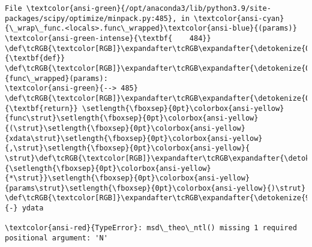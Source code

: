 \documentclass[11pt]{article}
\begin{document}
\begin{Verbatim}[commandchars=\\\{\}, frame=single, framerule=2mm, rulecolor=\color{outerrorbackground}]
File \textcolor{ansi-green}{/opt/anaconda3/lib/python3.9/site-packages/scipy/optimize/minpack.py:485}, in \textcolor{ansi-cyan}{\_wrap\_func.<locals>.func\_wrapped}\textcolor{ansi-blue}{(params)}
\textcolor{ansi-green-intense}{\textbf{    484}} \def\tcRGB{\textcolor[RGB]}\expandafter\tcRGB\expandafter{\detokenize{0,135,0}}{\textbf{def}} \def\tcRGB{\textcolor[RGB]}\expandafter\tcRGB\expandafter{\detokenize{0,0,255}}{func\_wrapped}(params):
\textcolor{ansi-green}{--> 485}     \def\tcRGB{\textcolor[RGB]}\expandafter\tcRGB\expandafter{\detokenize{0,135,0}}{\textbf{return}} \setlength{\fboxsep}{0pt}\colorbox{ansi-yellow}{func\strut}\setlength{\fboxsep}{0pt}\colorbox{ansi-yellow}{(\strut}\setlength{\fboxsep}{0pt}\colorbox{ansi-yellow}{xdata\strut}\setlength{\fboxsep}{0pt}\colorbox{ansi-yellow}{,\strut}\setlength{\fboxsep}{0pt}\colorbox{ansi-yellow}{ \strut}\def\tcRGB{\textcolor[RGB]}\expandafter\tcRGB\expandafter{\detokenize{98,98,98}}{\setlength{\fboxsep}{0pt}\colorbox{ansi-yellow}{*\strut}}\setlength{\fboxsep}{0pt}\colorbox{ansi-yellow}{params\strut}\setlength{\fboxsep}{0pt}\colorbox{ansi-yellow}{)\strut} \def\tcRGB{\textcolor[RGB]}\expandafter\tcRGB\expandafter{\detokenize{98,98,98}}{-} ydata

\textcolor{ansi-red}{TypeError}: msd\_theo\_ntl() missing 1 required positional argument: 'N'
    \end{Verbatim}
\end{document}

